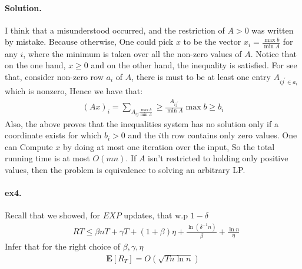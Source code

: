 \documentclass{article}
\newcommand{\expp}[1]{ \mathbf{E} \left[ {#1} \right]}
\begin{document}
\begin{multicols*}{2}
  \paragraph{Solution.} I think that a misunderstood occurred, and the restriction of $A > 0 $ was written by mistake. Because otherwise, One could pick $x$ to be the vector $x_{i} = \frac{\max{b}}{\min{A}}$ for any $i$, where the minimum is taken over all the non-zero values of $A$. Notice that on the one hand, $x \ge 0 $ and on the other hand, the inequality is satisfied. For see that, consider non-zero row $a_{i}$ of $A$, there is must to be at least one entry $A_{ij^{\prime} \in a_{i}}$ which is nonzero, Hence we have that: 
  \begin{equation*}
    \begin{split}
      \left( Ax \right)_{i} = \sum_{A_{ij} \frac{\max b }{ \min A} } \ge \frac{A_{ij^{\prime}}}{\min{A}}\max {b} \ge b_{i}
    \end{split}
  \end{equation*}
  Also, the above proves that the inequalities system has no solution only if a coordinate exists for which $b_{i} > 0$ and the $i$th row contains only zero values.  
  One can Compute $x$ by doing at most one iteration over the input, So the total running time is at most $O\left( m n \right)$. If $A$ isn't restricted to holding only positive values, then the problem is equivalence to solving an arbitrary LP. 
  \paragraph{ex4.} Recall that we showed, for $EXP$ updates, that w.p $1 - \delta$ 
  \begin{equation*}
    \begin{split}
      &  R{T} \le \beta n T + \gamma T + \left( 1 + \beta \right)\eta + \frac{\ln\left( \delta^{-1} n \right) }{\beta} + \frac{\ln n}{\eta}  
    \end{split}
  \end{equation*}
  Infer that for the right choice of $\beta,\gamma, \eta$ 
  \begin{equation*}
    \begin{split}
      \expp{R_{T}} = O\left( \sqrt{T n \ln n } \right)
    \end{split}
  \end{equation*}

\end{multicols*}
\end{document}
